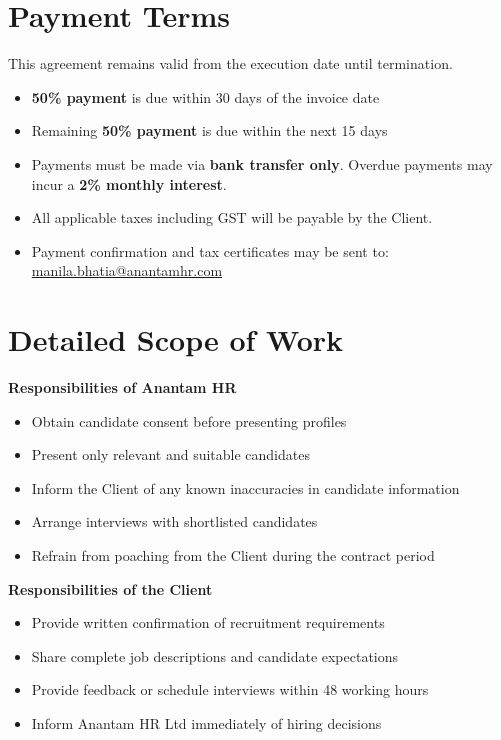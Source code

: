 \documentclass[12pt]{article}
\begin{document}
\section{Payment Terms}

This agreement remains valid from the execution date until termination.

\begin{itemize}
\item \textbf{50\% payment} is due within 30 days of the invoice date
\item Remaining \textbf{50\% payment} is due within the next 15 days
\item Payments must be made via \textbf{bank transfer only}. Overdue payments may incur a \textbf{2\% monthly interest}.
\item All applicable taxes including GST will be payable by the Client.
\item Payment confirmation and tax certificates may be sent to: \href{mailto:manila.bhatia@anantamhr.com}{manila.bhatia@anantamhr.com}
\end{itemize}

\section{Detailed Scope of Work}

\textbf{Responsibilities of Anantam HR}

\begin{itemize}
\item Obtain candidate consent before presenting profiles
\item Present only relevant and suitable candidates
\item Inform the Client of any known inaccuracies in candidate information
\item Arrange interviews with shortlisted candidates
\item Refrain from poaching from the Client during the contract period
\end{itemize}

\textbf{Responsibilities of the Client}

\begin{itemize}
\item Provide written confirmation of recruitment requirements
\item Share complete job descriptions and candidate expectations
\item Provide feedback or schedule interviews within 48 working hours
\item Inform Anantam HR Ltd immediately of hiring decisions
\end{itemize}
\end{document}
